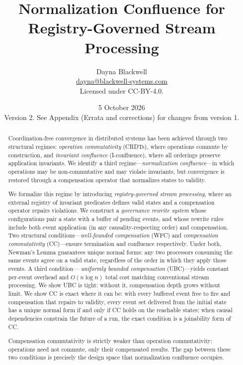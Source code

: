 \documentclass[11pt,a4paper]{article}
\title{Normalization Confluence for\\Registry-Governed Stream Processing}
\author{
Dayna Blackwell\\
\small\href{mailto:dayna@blackwell-systems.com}{dayna@blackwell-systems.com}\\
\small Licensed under CC-BY-4.0.}
\date{5 October 2026\\[4pt]
\small Version 2. See Appendix (Errata and corrections) for changes from version 1.}
\theoremstyle{plain}
\theoremstyle{definition}
\theoremstyle{remark}
\begin{document}
\maketitle

\begin{abstract}
\setlength{\parskip}{0.6\baselineskip plus 2pt minus 1pt}
Coordination-free convergence in distributed systems has been achieved through
two structural regimes: \emph{operation commutativity} (CRDTs), where
operations commute by construction, and \emph{invariant confluence}
(I-confluence), where all orderings preserve application invariants.  We
identify a third regime---\emph{normalization confluence}---in which
operations may be non-commutative and may violate invariants, but convergence
is restored through a compensation operator that normalizes states to
validity.

We formalize this regime by introducing \emph{registry-governed stream
processing}, where an external registry of invariant predicates defines valid
states and a compensation operator repairs violations.  We construct a
\emph{governance rewrite system} whose configurations pair a state with a
buffer of pending events, and whose rewrite rules include both event
application (in any causality-respecting order) and compensation.  Two
structural conditions---\emph{well-founded compensation} (WFC) and
\emph{compensation commutativity} (CC)---ensure termination and confluence
respectively.  Under both, Newman's Lemma guarantees unique normal forms: any
two processors consuming the same events agree on a valid state, regardless
of the order in which they apply those events.  A third condition---%
\emph{uniformly bounded compensation} (UBC)---yields constant per-event
overhead and $O(n \log n)$ total cost matching conventional stream processing.
We show UBC is tight: without it, compensation depth grows without limit.
We show CC is exact where it can be: with every buffered event free to fire
and compensation that repairs to validity, every event set delivered from the
initial state has a unique normal form if and only if CC holds on the
reachable states; when causal dependencies constrain the future of a run, the
exact condition is a joinability form of CC.

Compensation commutativity is strictly weaker than operation commutativity:
operations need not commute, only their compensated results.  The gap between
these two conditions is precisely the design space that normalization
confluence occupies.


\end{abstract}
\end{document}
